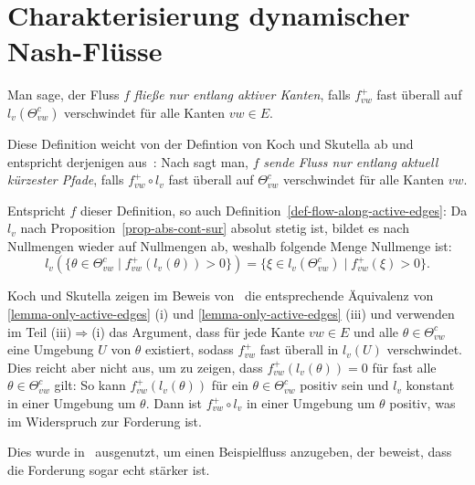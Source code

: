 \section{Charakterisierung dynamischer Nash-Flüsse}

\begin{definition}\label{def-flow-along-active-edges}
	Man sage, der Fluss $f$ \emph{fließe nur entlang aktiver Kanten}, falls $f_{vw}^+$ fast überall auf $l_v(\Theta_{vw}^c)$ verschwindet für alle Kanten $vw\in E$.
\end{definition}

\begin{remark}
	Diese Definition weicht von der Defintion von Koch und Skutella ab und entspricht derjenigen aus~\cite[Definition 1]{Cominetti2015}:
	Nach \cite[Definition 2]{Koch2011} sagt man, $f$ \emph{sende Fluss nur entlang aktuell kürzester Pfade}, falls $f_{vw}^+\circ l_v$ fast überall auf $\Theta_{vw}^c$ verschwindet für alle Kanten $vw$.
	
	Entspricht $f$ dieser Definition, so auch Definition~\ref{def-flow-along-active-edges}: 
	Da $l_v$ nach Proposition~\ref{prop-abs-cont-sur} absolut stetig ist, bildet es nach~\cite[Aufgabe 4.9]{Elstrodt2011} Nullmengen wieder auf Nullmengen ab, weshalb folgende Menge Nullmenge ist: $$l_v(\{ \theta \in \Theta_{vw}^c \mid f_{vw}^+ (l_v(\theta)) > 0 \}) = \{ \xi \in l_v(\Theta_{vw}^c) \mid f_{vw}^+ (\xi) > 0 \}.$$
	 
	Koch und Skutella zeigen im Beweis von~\cite[Lemma 1]{Koch2011} die entsprechende Äquivalenz von \ref{lemma-only-active-edges} (i) und \ref{lemma-only-active-edges} (iii) und
	verwenden im Teil (iii)$\Rightarrow$(i) das Argument, dass für jede Kante $vw\in E$ und alle $\theta\in \Theta_{vw}^c$ eine Umgebung $U$ von $\theta$ existiert, sodass $f_{vw}^+$ fast überall in $l_v(U)$ verschwindet.
	Dies reicht aber nicht aus, um zu zeigen, dass $f_{vw}^+(l_v(\theta))=0$ für fast alle $\theta\in\Theta_{vw}^c$ gilt:
	So kann $f_{vw}^+(l_v(\theta))$ für ein $\theta\in\Theta_{vw}^c$ positiv sein und $l_v$ konstant in einer Umgebung um $\theta$.
	Dann ist $f_{vw}^+ \circ l_v$ in einer Umgebung um $\theta$ positiv, was im Widerspruch zur Forderung ist.
	
	Dies wurde in~\cite[Example 2]{Cominetti2015} ausgenutzt, um einen Beispielfluss anzugeben, der beweist, dass die Forderung sogar echt stärker ist.
\end{remark}

